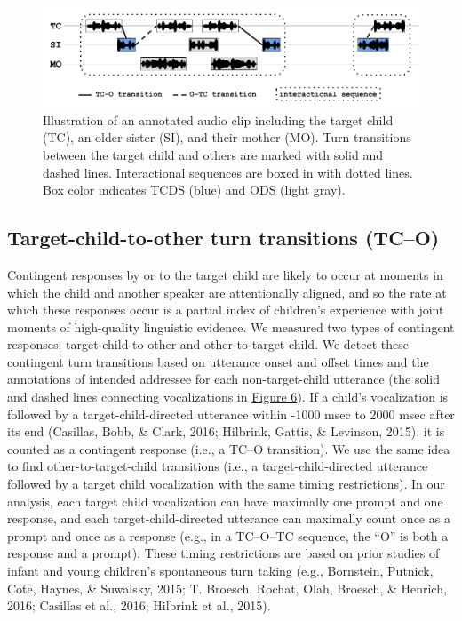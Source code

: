 \documentclass[floatsintext,man]{apa6}
\theoremstyle{definition}
\theoremstyle{definition}
\theoremstyle{definition}
\theoremstyle{remark}
\begin{document}
\begin{figure}

{\centering \includegraphics[width=1\linewidth]{Tseltal-CLE_files/TseltalCLE-TurnTimingIllustration} 

}

\caption{Illustration of an annotated audio clip including the target child (TC), an older sister (SI), and their mother (MO). Turn transitions between the target child and others are marked with solid and dashed lines. Interactional sequences are boxed in with dotted lines. Box color indicates TCDS (blue) and ODS (light gray).}\label{fig:fig6}
\end{figure}

\subsection{Target-child-to-other turn transitions
(TC--O)}\label{target-child-to-other-turn-transitions-tco}

Contingent responses by or to the target child are likely to occur at
moments in which the child and another speaker are attentionally
aligned, and so the rate at which these responses occur is a partial
index of children's experience with joint moments of high-quality
linguistic evidence. We measured two types of contingent responses:
target-child-to-other and other-to-target-child. We detect these
contingent turn transitions based on utterance onset and offset times
and the annotations of intended addressee for each non-target-child
utterance (the solid and dashed lines connecting vocalizations in
\protect\hyperlink{fig6}{Figure 6}). If a child's vocalization is
followed by a target-child-directed utterance within -1000 msec to 2000
msec after its end (Casillas, Bobb, \& Clark, 2016; Hilbrink, Gattis, \&
Levinson, 2015), it is counted as a contingent response (i.e., a TC--O
transition). We use the same idea to find other-to-target-child
transitions (i.e., a target-child-directed utterance followed by a
target child vocalization with the same timing restrictions). In our
analysis, each target child vocalization can have maximally one prompt
and one response, and each target-child-directed utterance can maximally
count once as a prompt and once as a response (e.g., in a TC--O--TC
sequence, the \enquote{O} is both a response and a prompt). These timing
restrictions are based on prior studies of infant and young children's
spontaneous turn taking (e.g., Bornstein, Putnick, Cote, Haynes, \&
Suwalsky, 2015; T. Broesch, Rochat, Olah, Broesch, \& Henrich, 2016;
Casillas et al., 2016; Hilbrink et al., 2015).
\end{document}
